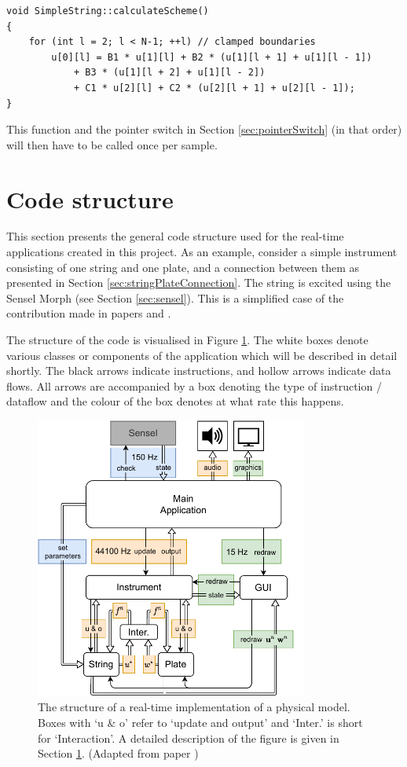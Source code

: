 \begin{lstlisting}[belowskip=-0.5\baselineskip]
void SimpleString::calculateScheme()
{
    for (int l = 2; l < N-1; ++l) // clamped boundaries
        u[0][l] = B1 * u[1][l] + B2 * (u[1][l + 1] + u[1][l - 1]) 
            + B3 * (u[1][l + 2] + u[1][l - 2])         
            + C1 * u[2][l] + C2 * (u[2][l + 1] + u[2][l - 1]);
}
\end{lstlisting}
This function and the pointer switch in Section \ref{sec:pointerSwitch} (in that order) will then have to be called once per sample.


\section{Code structure}\label{sec:codeStructure}
This section presents the general code structure used for the real-time applications created in this project. As an example, consider a simple instrument consisting of one string and one plate, and a connection between them as presented in Section \ref{sec:stringPlateConnection}. The string is excited using the Sensel Morph (see Section \ref{sec:sensel}). This is a simplified case of the contribution made in papers \citeP[A] and \citeP[B]. 

The structure of the code is visualised in Figure \ref{fig:codeStructure}. The white boxes denote various classes or components of the application which will be described in detail shortly. The black arrows indicate instructions, and hollow arrows indicate data flows. All arrows are accompanied by a box denoting the type of instruction / dataflow and the colour of the box denotes at what rate this happens.

\begin{figure}[h]
    \centering
    \includegraphics[width=0.8\textwidth]{figures/realtime/flowchart.pdf}
    \caption{The structure of a real-time implementation of a physical model. Boxes with `u \& o' refer to `update and output' and `Inter.' is short for `Interaction'. A detailed description of the figure is given in Section \ref{sec:codeStructure}. (Adapted from paper \citeP[A])\label{fig:codeStructure}}
\end{figure}

